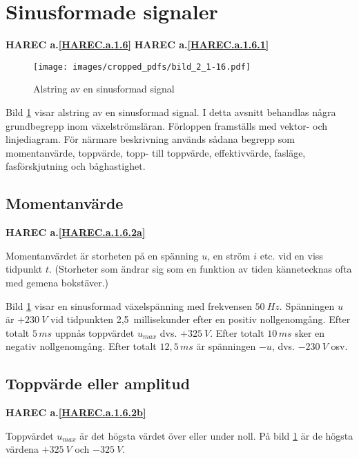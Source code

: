 \section{Sinusformade signaler}
\textbf{HAREC a.\ref{HAREC.a.1.6}\label{myHAREC.a.1.6}}
\textbf{HAREC a.\ref{HAREC.a.1.6.1}\label{myHAREC.a.1.6.1}}

\begin{figure}[ht]
\texttt{[image: images/cropped\_pdfs/bild\_2\_1-16.pdf]}
\caption{Alstring av en sinusformad signal}
\label{fig:BildII1-16}
\end{figure}

Bild \ref{fig:BildII1-16} visar alstring av en sinusformad signal.
I detta avsnitt behandlas några grundbegrepp inom växelströmsläran.
Förloppen framställs med vektor- och linjediagram.
För närmare beskrivning används sådana begrepp som momentanvärde,
toppvärde, topp- till toppvärde, effektivvärde, fasläge, fasförskjutning och
båghastighet.

\subsection{Momentanvärde}
\textbf{HAREC a.\ref{HAREC.a.1.6.2a}\label{myHAREC.a.1.6.2a}}

Momentanvärdet är storheten på en spänning \(u\), en ström \(i\) etc. vid en
viss tidpunkt \(t\).
(Storheter som ändrar sig som en funktion av tiden kännetecknas ofta med gemena
bokstäver.)

Bild \ref{fig:BildII1-16} visar en sinusformad växelspänning med frekvensen
\(50\ Hz\).
Spänningen \(u\) är \(+230\ V\) vid tidpunkten 2,5~millisekunder efter en
positiv nollgenomgång.
Efter totalt \(5\, ms\) uppnås toppvärdet \(u_{max}\) dvs. \(+325\ V\).
Efter totalt \(10\, ms\) sker en negativ nollgenomgång.
Efter totalt \(12,5\, ms\) är spänningen \(-u\), dvs. \(-230\ V\) osv.

\subsection{Toppvärde eller amplitud}
\textbf{HAREC a.\ref{HAREC.a.1.6.2b}\label{myHAREC.a.1.6.2b}}

Toppvärdet \(u_{max}\) är det högsta värdet över eller under noll.
På bild \ref{fig:BildII1-16} är de högsta värdena \(+325\ V\) och \(-325\ V\).


